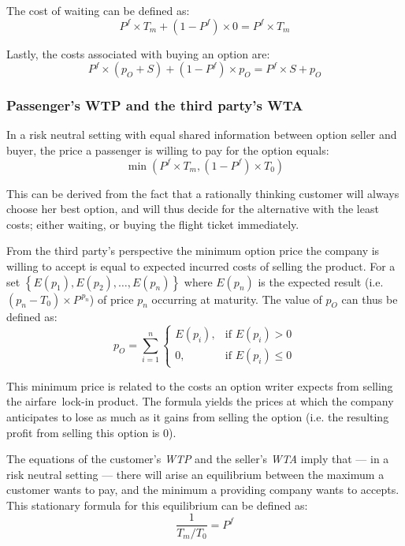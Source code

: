 The cost of waiting can be defined as:
\begin{equation*}
P^f \times T_m + (1 - P^f) \times 0 = P^f \times T_m
\end{equation*}

Lastly, the costs associated with buying an option are:
\begin{equation*}
P^f \times (p_O + S) + (1 - P^f) \times p_O = P^f \times S + p_O
\end{equation*}




\subsubsection{Passenger's WTP and the third party's WTA}
\label{subsec:PassengersWTP}
In a risk neutral setting with equal shared information between option seller and buyer, the price a passenger is willing to pay for the option equals:
\begin{equation*}
\min(P^f \times T_m, (1 - P^f) \times T_0)
\end{equation*}

This can be derived from the fact that a rationally thinking customer will always choose her best option, and will thus decide for the alternative with the least costs; either waiting, or buying the flight ticket immediately.

From the third party's perspective the minimum option price the company is willing to accept is equal to expected incurred costs of selling the product. For a set $\left\{ E(p_1), E(p_2), \ldots, E(p_n)\right\}$ where $E(p_n)$ is the expected result (i.e. $(p_n - T_0) \times P^{\,p_n}$) of price $p_n$ occurring at maturity. The value of $p_O$ can thus be defined as:
\begin{equation*}
p_O = \sum\limits_{i=1}^n\begin{cases}
     E(p_i), & \mbox{if } E(p_i) > 0 \\
    0, & \mbox{if } E(p_i) \le 0 \end{cases}
\end{equation*}

This minimum price is related to the costs an option writer expects from selling the airfare~lock-in product. The formula yields the prices at which the company anticipates to lose as much as it gains from selling the option (i.e. the resulting profit from selling this option is $0$).

The equations of the customer's \emph{WTP} and the seller's \emph{WTA} imply that --- in a risk neutral setting --- there will arise an equilibrium between the maximum a customer wants to pay, and the minimum a providing company wants to accepts. This stationary formula for this equilibrium can be defined as:
\begin{equation*}
\frac{1}{T_m/T_0} = P^f
\end{equation*}

